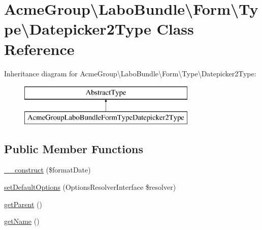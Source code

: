 \hypertarget{class_acme_group_1_1_labo_bundle_1_1_form_1_1_type_1_1_datepicker2_type}{\section{Acme\+Group\textbackslash{}Labo\+Bundle\textbackslash{}Form\textbackslash{}Type\textbackslash{}Datepicker2\+Type Class Reference}
\label{class_acme_group_1_1_labo_bundle_1_1_form_1_1_type_1_1_datepicker2_type}
}
Inheritance diagram for Acme\+Group\textbackslash{}Labo\+Bundle\textbackslash{}Form\textbackslash{}Type\textbackslash{}Datepicker2\+Type\+:\begin{figure}[H]
\begin{center}
\leavevmode
\includegraphics[height=2.000000cm]{class_acme_group_1_1_labo_bundle_1_1_form_1_1_type_1_1_datepicker2_type}
\end{center}
\end{figure}
\subsection*{Public Member Functions}
\begin{DoxyCompactItemize}
\item 
\hyperlink{class_acme_group_1_1_labo_bundle_1_1_form_1_1_type_1_1_datepicker2_type_a3d9fb6c51029e18507a9839f0786f6aa}{\+\_\+\+\_\+construct} (\$format\+Date)
\item 
\hyperlink{class_acme_group_1_1_labo_bundle_1_1_form_1_1_type_1_1_datepicker2_type_aa6842c7778c25f7ace9b4b3674af1772}{set\+Default\+Options} (Options\+Resolver\+Interface \$resolver)
\item 
\hyperlink{class_acme_group_1_1_labo_bundle_1_1_form_1_1_type_1_1_datepicker2_type_ab21c8fb03637d7ca328f8b2954c58a2f}{get\+Parent} ()
\item 
\hyperlink{class_acme_group_1_1_labo_bundle_1_1_form_1_1_type_1_1_datepicker2_type_afe8c174ca8eda7deafc8e8641947ed4c}{get\+Name} ()
\end{DoxyCompactItemize}


